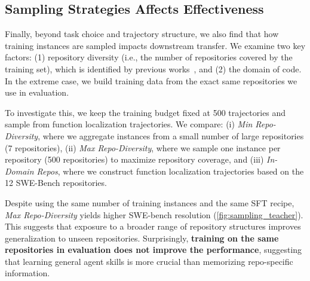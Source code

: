 \subsection{Sampling Strategies Affects Effectiveness}
Finally, beyond task choice and trajectory structure, we also find that how training instances are sampled impacts downstream transfer. 
We examine two key factors: 
(1) repository diversity (i.e., the number of repositories covered by the training set), which is identified by previous works~\cite{repost,swe-smith}, and 
(2) the domain of code. In the extreme case, we build training data from the exact same repositories we use in evaluation.

To investigate this, we keep the training budget fixed at 500 trajectories and sample from function localization trajectories. We compare:
(i) \emph{Min Repo-Diversity}, where we aggregate instances from a small number of large repositories (7 repositories), 
(ii) \emph{Max Repo-Diversity}, where we sample one instance per repository (500 repositories) to maximize repository coverage, and 
(iii) \emph{In-Domain Repos}, where we construct function localization trajectories based on the 12 SWE-Bench repositories.

Despite using the same number of training instances and the same SFT recipe, \emph{Max Repo-Diversity} yields higher SWE-bench resolution (\autoref{fig:sampling_teacher}). 
This suggests that exposure to a broader range of repository structures improves generalization to unseen repositories.
Surprisingly, \textbf{training on the same repositories in evaluation does not improve the performance}, suggesting that learning general agent skills is more crucial than memorizing repo-specific information.





